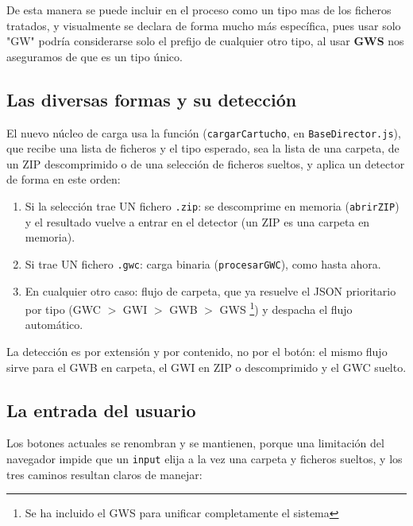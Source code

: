De esta manera se puede incluir en el proceso como un tipo mas de los ficheros 
tratados, y visualmente se declara de forma mucho  más específica, pues usar 
solo "GW" podría considerarse solo el prefijo de cualquier otro tipo, al usar 
\textbf{GWS} nos aseguramos de que es un tipo único.

\subsection{Las diversas formas y su detección}
\label{sec:F5I9Formas}

El nuevo núcleo de carga  usa la función (\texttt{cargarCartucho}, en
\texttt{BaseDirector.js}), que recibe una lista de ficheros y el tipo
esperado, sea la lista de una carpeta, de un ZIP descomprimido o de
una selección de ficheros sueltos, y aplica un detector de forma en
este orden:

\begin{enumerate}
	\item Si la selección trae UN fichero \texttt{.zip}: se
	descomprime en memoria (\texttt{abrirZIP}) y el resultado vuelve a
	entrar en el detector (un ZIP es una carpeta en memoria).
	
	\item Si trae UN fichero \texttt{.gwc}: carga binaria
	(\texttt{procesarGWC}), como hasta ahora.
	
	\item En cualquier otro caso: flujo de carpeta, que ya resuelve el
	JSON prioritario por tipo (GWC $>$ GWI $>$ GWB  $>$ GWS
	\footnote{Se ha incluido el GWS para unificar completamente el sistema}) 
	y despacha el flujo automático.
\end{enumerate}

La detección es por extensión y por contenido, no por el botón: el
mismo flujo sirve para el GWB en carpeta, el GWI en ZIP o descomprimido
y el GWC suelto.

\subsection{La entrada del usuario}
\label{sec:F5I9Entrada}

Los botones actuales se renombran y se mantienen, porque una
limitación del navegador impide que un \texttt{input} elija a la vez
una carpeta y ficheros sueltos, y los tres caminos resultan claros
de manejar:

